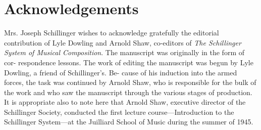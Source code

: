 \chapter{Acknowledgements}

Mrs. Joseph Schillinger wishes to acknowledge gratefully the editorial
contribution of Lyle Dowling and Arnold Shaw, co-editors of \textit{The
Schillinger System of Musical Composition}. The manuscript was
originally in the form of cor- respondence lessons. The work of editing the
manuscript was begun by Lyle Dowling, a friend of Schillinger's. Be- cause of
his induction into the armed forces, the task was continued by Arnold Shaw, who
is responsible for the bulk of the work and who saw the manuscript through the
various stages of production. It is appropriate also to note here that Arnold
Shaw, executive director of the Schillinger Society, conducted the first
lecture course---Introduction to the Schillinger System---at the Juilliard School
of Music during the summer of 1945.

